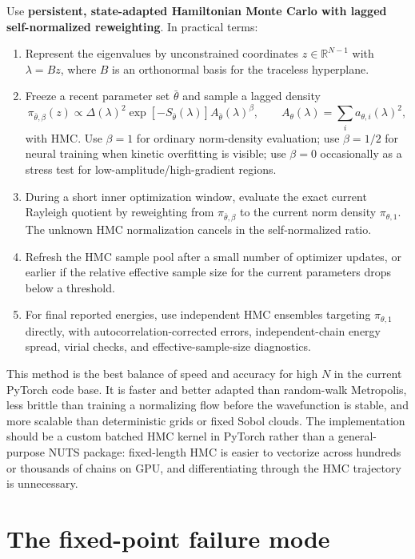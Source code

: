 \documentclass[11pt]{article}
\newcommand{\R}{\mathbb{R}}
\begin{document}
Use \textbf{persistent, state-adapted Hamiltonian Monte Carlo with lagged self-normalized reweighting}.  In practical terms:
\begin{enumerate}[label=\textbf{R\arabic*.},leftmargin=*]
\item Represent the eigenvalues by unconstrained coordinates $z\in\R^{N-1}$ with $\lambda=Bz$, where $B$ is an orthonormal basis for the traceless hyperplane.
\item Freeze a recent parameter set $\bar\theta$ and sample a lagged density
\begin{equation}
 \pi_{\bar\theta,\beta}(z)\propto
 \Delta(\lambda)^2\exp[-S_{\bar\theta}(\lambda)]
 A_{\bar\theta}(\lambda)^\beta,
 \qquad
 A_\theta(\lambda)=\sum_i a_{\theta,i}(\lambda)^2,
 \label{eq:lagged_beta_density}
\end{equation}
with HMC.  Use $\beta=1$ for ordinary norm-density evaluation; use $\beta=1/2$ for neural training when kinetic overfitting is visible; use $\beta=0$ occasionally as a stress test for low-amplitude/high-gradient regions.
\item During a short inner optimization window, evaluate the exact current Rayleigh quotient by reweighting from $\pi_{\bar\theta,\beta}$ to the current norm density $\pi_{\theta,1}$.  The unknown HMC normalization cancels in the self-normalized ratio.
\item Refresh the HMC sample pool after a small number of optimizer updates, or earlier if the relative effective sample size for the current parameters drops below a threshold.
\item For final reported energies, use independent HMC ensembles targeting $\pi_{\theta,1}$ directly, with autocorrelation-corrected errors, independent-chain energy spread, virial checks, and effective-sample-size diagnostics.
\end{enumerate}

This method is the best balance of speed and accuracy for high $N$ in the current PyTorch code base.  It is faster and better adapted than random-walk Metropolis, less brittle than training a normalizing flow before the wavefunction is stable, and more scalable than deterministic grids or fixed Sobol clouds.  The implementation should be a custom batched HMC kernel in PyTorch rather than a general-purpose NUTS package: fixed-length HMC is easier to vectorize across hundreds or thousands of chains on GPU, and differentiating through the HMC trajectory is unnecessary.

\section{The fixed-point failure mode}
\end{document}

